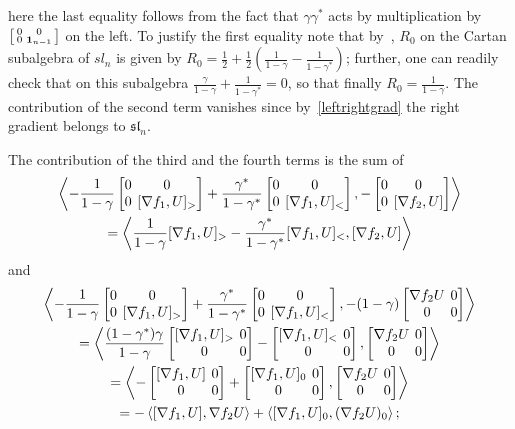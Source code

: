 \documentclass{amsart}
\theoremstyle{definition}
\theoremstyle{remark}
\numberwithin{equation}{section}
\numberwithin{theorem}{section}
\def\nablac{{\nabla}}
\def\nar{\setlength\arraycolsep{2pt}}
\def\one{\mathbf 1}
\def\sl{\mathfrak {sl}}
\begin{document}
here the last equality follows from the fact that
$\gamma\gamma^*$ acts by multiplication by 
$\left[\begin{smallmatrix} 0&0\cr 0& \one_{n-1}\end{smallmatrix}\right]$ on the left.
To justify the first equality note that by~\cite[Lemma 4.2]{GSVple}, $R_0$ on the Cartan subalgebra of $sl_n$ is given by 
$R_0=\frac12+\frac12\left(\frac1{1-\gamma}-\frac1{1-\gamma^*}\right)$; further, one can readily check that on this subalgebra
$\frac{\gamma}{1-\gamma}+\frac1{1-\gamma^*}=0$, so that finally $R_0=\frac1{1-\gamma}$.  The contribution
of the second term vanishes since by~\eqref{leftrightgrad} the right gradient belongs to $\sl_n$.

The contribution of the third and the fourth terms is the sum of
\begin{multline*}
\left\langle -\frac1{1-\gamma}\nar\begin{bmatrix} 0 & 0\cr 0 & [\nablac f_1, U]_>\end{bmatrix}
+\frac{\gamma^*}{1-\gamma^*}\begin{bmatrix} 0 & 0\cr 0 & [\nablac f_1, U]_<\end{bmatrix},
-\begin{bmatrix} 0 & 0\cr 0 & [\nablac f_2, U]\end{bmatrix}\right\rangle\\=
\left\langle \frac1{1-\gamma}[\nablac f_1, U]_>-\frac{\gamma^*}{1-\gamma^*}[\nablac f_1, U]_<,[\nablac f_2, U]\right\rangle
\end{multline*}
and
\begin{multline*}
\left\langle -\frac1{1-\gamma}\nar\begin{bmatrix} 0 & 0\cr 0 & [\nablac f_1, U]_>\end{bmatrix}
+\frac{\gamma^*}{1-\gamma^*}\begin{bmatrix} 0 & 0\cr 0 & [\nablac f_1, U]_<\end{bmatrix},
-(1-\gamma)\begin{bmatrix} \nablac f_2 U & 0\cr 0 & 0\end{bmatrix}\right\rangle\\=
\left\langle \frac{(1-\gamma^*)\gamma}{1-\gamma}\nar\begin{bmatrix} [\nablac f_1, U]_>& 0\cr 0&0\end{bmatrix}
-\begin{bmatrix} [\nablac f_1, U]_<& 0\cr 0&0\end{bmatrix},\begin{bmatrix} \nablac f_2 U & 0\cr 0 & 0\end{bmatrix}\right\rangle\\=
\left\langle -\nar\begin{bmatrix} [\nablac f_1, U]& 0\cr 0&0\end{bmatrix}+\begin{bmatrix} [\nablac f_1, U]_0& 0\cr 0&0\end{bmatrix},
\begin{bmatrix} \nablac f_2 U & 0\cr 0 & 0\end{bmatrix}\right\rangle\\=
-\left\langle  [\nablac f_1, U],\nablac f_2 U\right\rangle+\left\langle  [\nablac f_1, U]_0,(\nablac f_2 U)_0\right\rangle;
\end{multline*}
\end{document}

